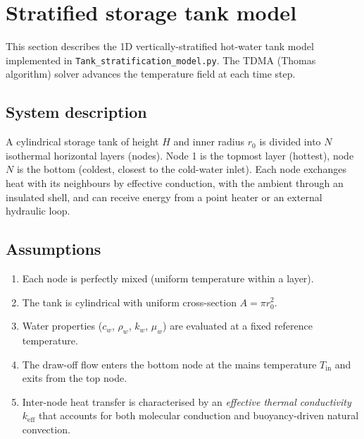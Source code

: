 \section{Stratified storage tank model}
\label{sec:tank-stratification}

This section describes the 1D vertically-stratified hot-water tank model implemented in \texttt{Tank\_stratification\_model.py}. The TDMA (Thomas algorithm) solver advances the temperature field at each time step.

\subsection{System description}

A cylindrical storage tank of height $H$ and inner radius $r_0$ is divided into $N$ isothermal horizontal layers (nodes). Node 1 is the topmost layer (hottest), node $N$ is the bottom (coldest, closest to the cold-water inlet). Each node exchanges heat with its neighbours by effective conduction, with the ambient through an insulated shell, and can receive energy from a point heater or an external hydraulic loop.

\subsection{Assumptions}
\label{sec:tank-assumptions}

\begin{enumerate}
  \item Each node is perfectly mixed (uniform temperature within a layer).
  \item The tank is cylindrical with uniform cross-section $A = \pi r_0^2$.
  \item Water properties ($c_w$, $\rho_w$, $k_w$, $\mu_w$) are evaluated at a fixed reference temperature.
  \item The draw-off flow enters the bottom node at the mains temperature $T_\text{in}$ and exits from the top node.
  \item Inter-node heat transfer is characterised by an \emph{effective thermal conductivity} $k_\text{eff}$ that accounts for both molecular conduction and buoyancy-driven natural convection.
\end{enumerate}

